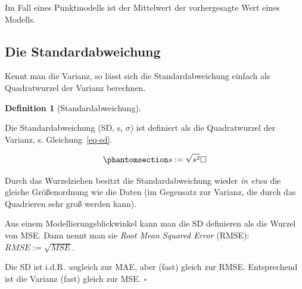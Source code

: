\documentclass[
  letterpaper,
]{scrbook}
\theoremstyle{definition}
\theoremstyle{definition}
\theoremstyle{definition}
\newtheorem{definition}{Definition}[chapter]
\theoremstyle{remark}
\begin{document}
Im Fall eines Punktmodells ist der Mittelwert der vorhergesagte Wert
eines Modells.

\subsection{Die Standardabweichung}\label{die-standardabweichung}

Kennt man die Varianz, so lässt sich die Standardabweichung einfach als
Quadratwurzel der Varianz berechnen.

\begin{definition}[Standardabweichung]\protect\hypertarget{def-sd}{}\label{def-sd}

Die Standardabweichung (SD, s, \(\sigma\)) ist definiert als die
Quadratwurzel der Varianz, s. Gleichung~\ref{eq-sd}.

\begin{equation}\phantomsection\label{eq-sd}{s := \sqrt{s^2} \square}\end{equation}

\end{definition}

Durch das Wurzelziehen besitzt die Standardabweichung wieder \emph{in
etwa} die gleiche Größenordnung wie die Daten (im Gegensatz zur Varianz,
die durch das Quadrieren sehr groß werden kann).

Aus einem Modellierungsblickwinkel kann man die SD definieren als die
Wurzel von MSE. Dann nennt man sie \emph{Root Mean Squared Error}
(RMSE): \(RMSE := \sqrt{MSE}\).

\begin{tcolorbox}[enhanced jigsaw, colbacktitle=quarto-callout-note-color!10!white, toptitle=1mm, colframe=quarto-callout-note-color-frame, breakable, toprule=.15mm, bottomrule=.15mm, bottomtitle=1mm, left=2mm, opacitybacktitle=0.6, colback=white, arc=.35mm, coltitle=black, title=\textcolor{quarto-callout-note-color}{\faInfo}\hspace{0.5em}{Hinweis}, opacityback=0, rightrule=.15mm, leftrule=.75mm, titlerule=0mm]

Die SD ist i.d.R. \emph{un}gleich zur MAE, aber (fast) gleich zur RMSE.
Entsprechend ist die Varianz (fast) gleich zur MSE. \(\square\)

\end{tcolorbox}
\end{document}
